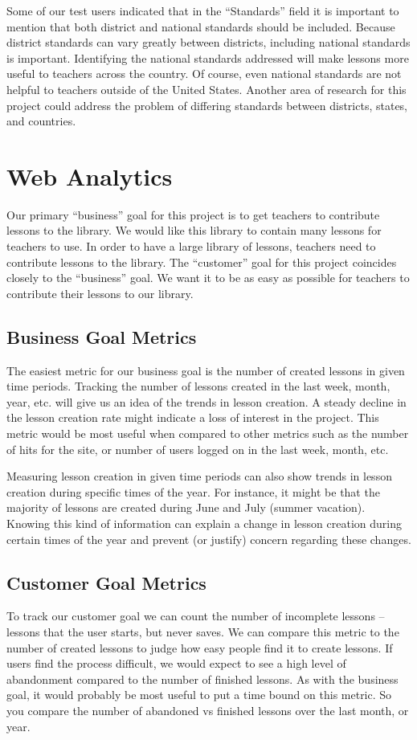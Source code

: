 \documentclass[10pt,letter,titlepage]{article}
\begin{document}
Some of our test users indicated that in the ``Standards'' field it is important
to mention that both district and national standards should be included. Because
district standards can vary greatly between districts, including national
standards is important. Identifying the national standards addressed will make
lessons more useful to teachers across the country. Of course, even national
standards are not helpful to teachers outside of the United States. Another area
of research for this project could address the problem of differing standards
between districts, states, and countries.

\section{Web Analytics}
Our primary ``business'' goal for this project is to get teachers to contribute
lessons to the library. We would like this library to contain many lessons for
teachers to use. In order to have a large library of lessons, teachers need to
contribute lessons to the library. The ``customer'' goal for this project
coincides closely to the ``business'' goal. We want it to be as easy as possible
for teachers to contribute their lessons to our library.

\subsection{Business Goal Metrics}
The easiest metric for our business goal is the number of created lessons in
given time periods. Tracking the number of lessons created in the last week,
month, year, etc. will give us an idea of the trends in lesson creation. A
steady decline in the lesson creation rate might indicate a loss of interest in
the project. This metric would be most useful when compared to other metrics
such as the number of hits for the site, or number of users logged on in the
last week, month, etc.

Measuring lesson creation in given time periods can also show trends in lesson
creation during specific times of the year. For instance, it might be that the
majority of lessons are created during June and July (summer vacation). Knowing
this kind of information can explain a change in lesson creation during certain
times of the year and prevent (or justify) concern regarding these changes.

\subsection{Customer Goal Metrics}
To track our customer goal we can count the number of incomplete lessons --
lessons that the user starts, but never saves. We can compare this metric to the
number of created lessons to judge how easy people find it to create lessons.
If users find the process difficult, we would expect to see a high level of
abandonment compared to the number of finished lessons. As with the business
goal, it would probably be most useful to put a time bound on this metric. So
you compare the number of abandoned vs finished lessons over the last month, or
year.
\end{document}
